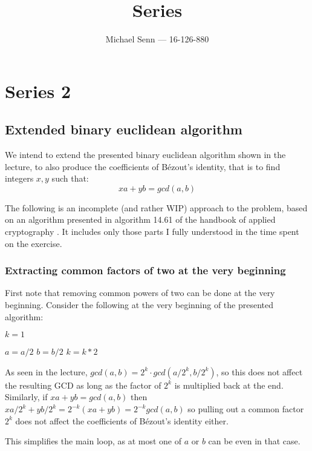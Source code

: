 \documentclass[a4paper]{scrreprt}
\title{Series \series}
\author{Michael Senn \maillink{michael.senn@students.unibe.ch} --- 16-126-880}
\date{\printdate}
\newcommand{\series}{2}
\begin{document}
\maketitle


\setcounter{chapter}{\numexpr \series - 1 \relax}

\chapter{Series \series}

\section{Extended binary euclidean algorithm}

We intend to extend the presented binary euclidean algorithm shown in the
lecture, to also produce the coefficients of Bézout's identity, that is to find
integers $x, y$ such that:
\[
		xa + yb = gcd(a, b)
\]

The following is an incomplete (and rather WIP) approach to the problem, based
on an algorithm presented in algorithm 14.61 of the handbook of applied
cryptography \autocite{menezesHandbookAppliedCryptography1997}. It includes
only those parts I fully understood in the time spent on the exercise.

\subsection{Extracting common factors of two at the very beginning}

First note that removing common powers of two can be done at the very
beginning. Consider the following at the very beginning of the presented
algorithm:

\begin{algorithmic}
 	\State $k = 1$

 			\State $a = a / 2$
 			\State $b = b / 2$
 			\State $k = k * 2$
 	\EndWhile
\end{algorithmic}

As seen in the lecture, $gcd(a, b) = 2^k \cdot gcd(a / 2^k, b / 2^k)$, so this
does not affect the resulting GCD as long as the factor of $2^k$ is multiplied
back at the end. Similarly, if $xa + yb = gcd(a, b)$ then $xa / 2^k + yb / 2^k
= 2^{-k} (xa + yb) = 2^{-k} gcd(a, b)$ so pulling out a common factor $2^k$
does not affect the coefficients of Bézout's identity either.

This simplifies the main loop, as at most one of $a$ or $b$ can be even in that
case.
\end{document}

